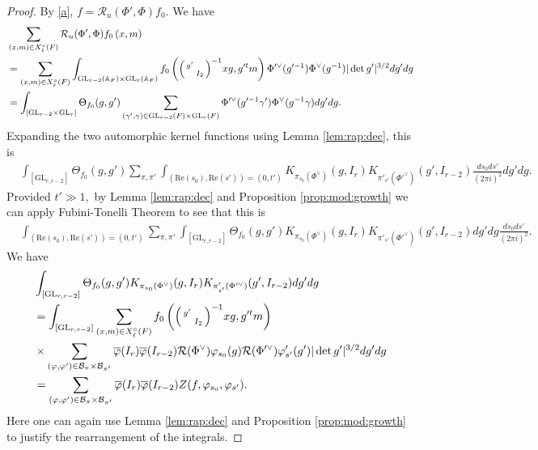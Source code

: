 \documentclass[12pt]{amsart}
\theoremstyle{remark}
\numberwithin{equation}{section}
\newcommand{\A}{\mathbb{A}}
\newcommand{\GL}{\mathrm{GL}}
\theoremstyle{definition}
\newenvironment{psmatrix}
  {\left(\begin{smallmatrix}}
  {\end{smallmatrix}\right)}
\numberwithin{equation}{subsection}
\begin{document}
\begin{proof}
By \eqref{a}, $f=\mathcal{R}_u(\Phi',\Phi)f_0.$ We have
\begin{align*}
&\sum_{(x,m) \in X_\ell^\circ(F)}\mathcal{R}_u(\Phi',\Phi)f_0\left(x,m\right)\\
&=\sum_{(x,m)\in X_\ell^\circ(F) }\int_{\GL_{r-2}(\A_F) \times \GL_r(\A_F)}f_0\left(\begin{psmatrix} g' & \\ & I_2 \end{psmatrix}^{-1}xg,g'^{t}m \right)\Phi'^\vee(g'^{-1})\Phi^\vee(g^{-1})|\det g'|^{3/2}dg'dg\\
&=\int_{[\GL_{r-2} \times \GL_r]}\Theta_{f_0}(g,g')\sum_{(\gamma',\gamma) \in \GL_{r-2}(F) \times \GL_{r}(F)}\Phi'^\vee(g'^{-1}\gamma')\Phi^\vee(g^{-1}\gamma )dg'dg.
\end{align*}
Expanding the two automorphic kernel functions using Lemma \ref{lem:rap:dec}, this is 
\begin{align*}
&\int_{[\GL_{r,r-2}]}
\Theta_{f_0}(g,g')
\sum_{\pi,\pi'}\int_{(\mathrm{Re}(s_0),\mathrm{Re}(s'))=(0,t')}K_{\pi_{s_0}(\Phi^\vee)}(g,I_r)K_{\pi'_{s'}(\Phi'^\vee)}(g',I_{r-2}) \frac{ds_0 ds'}{(2\pi i)^2}dg'dg.
\end{align*}
Provided $t' \gg 1,$ by Lemma \ref{lem:rap:dec} and Proposition \ref{prop:mod:growth} we can apply Fubini-Tonelli Theorem to see that this is 
\begin{align*}
&\int_{(\mathrm{Re}(s_0),\mathrm{Re}(s'))=(0,t')}\sum_{\pi,\pi'}\int_{[\GL_{r,r-2}] }\Theta_{f_0}(g,g') K_{\pi_{s_0}(\Phi^\vee)}(g,I_r) K_{\pi'_{s'}(\Phi'^{\vee})}(g',I_{r-2})dg'dg\frac{ds_0 ds'}{(2\pi i)^2}.
\end{align*}
 We have
\begin{align*}
   & \int_{[\GL_{r,r-2}]}\Theta_{f_0}(g,g') K_{\pi_{s_0}(\Phi^\vee)}(g,I_r) K_{\pi'_{s'}(\Phi'^{\vee})}(g',I_{r-2})dg'dg\\
    &=\int_{[\GL_{r,r-2}]}\sum_{(x,m) \in X_\ell^\circ(F)}f_0\left(\begin{psmatrix} g' & \\ & I_2 \end{psmatrix}^{-1}xg,g'^{t}m \right)\\& \times \sum_{(\varphi,\varphi') \in \mathcal{B}_{\pi} \times \mathcal{B}_{\pi'}}\overline{\varphi}(I_r)\overline{\varphi}(I_{r-2})\mathcal{R}(\Phi^\vee)\varphi_{s_0}(g)
    \mathcal{R}(\Phi'^\vee)\varphi'_{s'}(g')|\det g'|^{3/2}
   dg'dg\\
   &=\sum_{(\varphi,\varphi') \in \mathcal{B}_{\pi} \times \mathcal{B}_{\pi'}}\overline{\varphi}(I_r)\overline{\varphi}(I_{r-2}) Z(f,\varphi_{s_0},\varphi_{s'}).
\end{align*} 
Here one can again use 
 Lemma \ref{lem:rap:dec} and Proposition \ref{prop:mod:growth} to justify the rearrangement of the integrals.
\end{proof}
\end{document}
